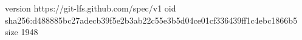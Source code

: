 version https://git-lfs.github.com/spec/v1
oid sha256:d488885bc27adecb39f5e2b3ab22c55e3b5d04ce01cf336439ff1c4ebc1866b5
size 1948
